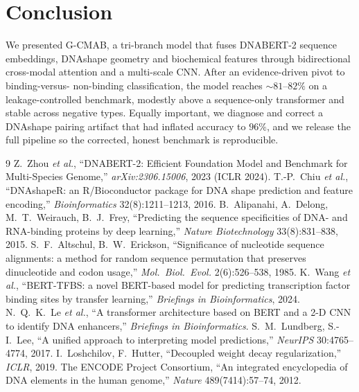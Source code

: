 \documentclass[11pt]{article}
\begin{document}
\section{Conclusion}
We presented G-CMAB, a tri-branch model that fuses DNABERT-2 sequence embeddings,
DNAshape geometry and biochemical features through bidirectional cross-modal
attention and a multi-scale CNN. After an evidence-driven pivot to binding-versus-
non-binding classification, the model reaches $\sim\!81$--$82\%$ on a leakage-controlled
benchmark, modestly above a sequence-only transformer and stable across negative
types. Equally important, we diagnose and correct a DNAshape pairing artifact that had
inflated accuracy to $96\%$, and we release the full pipeline so the corrected,
honest benchmark is reproducible.

\begin{thebibliography}{9}
 Z.\ Zhou \emph{et al.}, ``DNABERT-2: Efficient Foundation Model
and Benchmark for Multi-Species Genome,'' \emph{arXiv:2306.15006}, 2023 (ICLR 2024).
 T.-P.\ Chiu \emph{et al.}, ``DNAshapeR: an R/Bioconductor package
for DNA shape prediction and feature encoding,'' \emph{Bioinformatics}
32(8):1211--1213, 2016.
 B.\ Alipanahi, A.\ Delong, M.\ T.\ Weirauch, B.\ J.\ Frey,
``Predicting the sequence specificities of DNA- and RNA-binding proteins by deep
learning,'' \emph{Nature Biotechnology} 33(8):831--838, 2015.
 S.\ F.\ Altschul, B.\ W.\ Erickson, ``Significance of nucleotide
sequence alignments: a method for random sequence permutation that preserves
dinucleotide and codon usage,'' \emph{Mol.\ Biol.\ Evol.} 2(6):526--538, 1985.
 K.\ Wang \emph{et al.}, ``BERT-TFBS: a novel BERT-based model for
predicting transcription factor binding sites by transfer learning,''
\emph{Briefings in Bioinformatics}, 2024.
 N.\ Q.\ K.\ Le \emph{et al.}, ``A transformer architecture based on BERT
and a 2-D CNN to identify DNA enhancers,'' \emph{Briefings in Bioinformatics}.
 S.\ M.\ Lundberg, S.-I.\ Lee, ``A unified approach to interpreting
model predictions,'' \emph{NeurIPS} 30:4765--4774, 2017.
 I.\ Loshchilov, F.\ Hutter, ``Decoupled weight decay
regularization,'' \emph{ICLR}, 2019.
 The ENCODE Project Consortium, ``An integrated encyclopedia of DNA
elements in the human genome,'' \emph{Nature} 489(7414):57--74, 2012.
\end{thebibliography}
\end{document}
